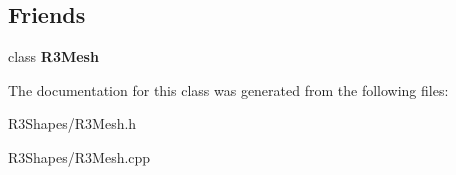 \subsection*{Friends}
\begin{DoxyCompactItemize}
\item 
class {\bfseries R3\+Mesh}\hypertarget{class_r3_mesh_edge_ad14836d445f783f84efa263168bb3167}{}\label{class_r3_mesh_edge_ad14836d445f783f84efa263168bb3167}

\end{DoxyCompactItemize}


The documentation for this class was generated from the following files\+:\begin{DoxyCompactItemize}
\item 
R3\+Shapes/R3\+Mesh.\+h\item 
R3\+Shapes/R3\+Mesh.\+cpp\end{DoxyCompactItemize}
